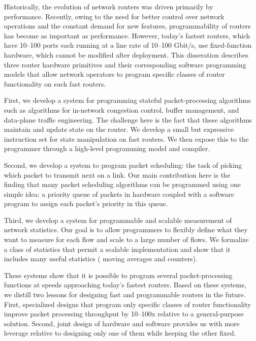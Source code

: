 % 
% 
%
Historically, the evolution of network routers was driven primarily by
performance. Recently, owing to the need for better control over network
operations and the constant demand for new features, programmability of routers
has become as important as performance.  However, today's fastest routers,
which have 10--100 ports each running at a line rate of 10--100 Gbit/s, use
fixed-function hardware, which cannot be modified after deployment. This
disseration describes three router hardware primitives and their
corresponding software programming models that allow network operators to
program specific classes of router functionality on such fast routers.

First, we develop a system for programming stateful packet-processing
algorithms such as algorithms for in-network congestion control, buffer
management, and data-plane traffic engineering. The challenge here is the fact
that these algorithms maintain and update state on the router.  We develop a
small but expressive instruction set for state manipulation on fast routers.
 We then expose this to the programmer through a high-level programming model
and compiler.

Second, we develop a system to program packet scheduling: the task of picking
which packet to transmit next on a link. Our main contribution here is the
finding that many packet scheduling algorithms can be programmed using one
simple idea: a priority queue of packets in hardware coupled with a software
program to assign each packet's priority in this queue.

Third, we develop a system for programmable and scalable measurement of network
statistics. Our goal is to allow programmers to flexibly define what they want
to measure for each flow and scale to a large number of flows. We formalize
a class of statistics that permit a scalable
implementation and show that it includes many useful statistics (\eg
moving averages and counters).

These systems show that it is possible to program several packet-processing
functions at speeds approaching today's fastest routers. Based on these systems, we
distill two lessons for designing fast and programmable routers in the future.
First, specialized designs that program only specific classes of router
functionality improve packet processing throughput by 10--100x relative to a general-purpose
solution. Second, joint design of
hardware and software provides us with more leverage relative to designing only
one of them while keeping the other fixed.

